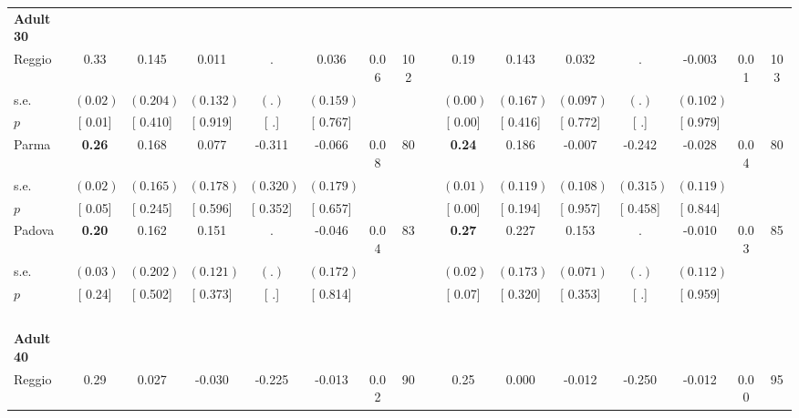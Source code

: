 \begin{longtable}{L{8em} c c c c c c c p{1em} c c c c c c c}
\quad \quad \textbf{Adult 30} & & & & & & & & & & & & & & & \\* 
\quad \quad \quad Reggio& 0.33 &     0.145 &     0.011 &         . &     0.036 &      0.06 &       102 & & 0.19 &     0.143 &     0.032 &         . &    -0.003 &      0.01 &       103  \\*
\quad \quad \quad \quad s.e.& $ (     0.02)$ & $ (    0.204)$ & $ (    0.132)$ & $ (        .)$ & $ (    0.159)$ & & & & $ (     0.00)$ & $ (    0.167)$ & $ (    0.097)$ & $ (        .)$ & $ (    0.102)$ & &  \\*
\quad \quad \quad \quad $ p$ & [     0.01] & [    0.410] & [    0.919] & [        .] & [    0.767] & & & & [     0.00] & [    0.416] & [    0.772] & [        .] & [    0.979] & &  \\[1em]
\quad \quad \quad Parma& \textbf{     0.26} &     0.168 &     0.077 &    -0.311 &    -0.066 &      0.08 &        80 & & \textbf{     0.24} &     0.186 &    -0.007 &    -0.242 &    -0.028 &      0.04 &        80  \\*
\quad \quad \quad \quad s.e.& $ (     0.02)$ & $ (    0.165)$ & $ (    0.178)$ & $ (    0.320)$ & $ (    0.179)$ & & & & $ (     0.01)$ & $ (    0.119)$ & $ (    0.108)$ & $ (    0.315)$ & $ (    0.119)$ & &  \\*
\quad \quad \quad \quad $ p$ & [     0.05] & [    0.245] & [    0.596] & [    0.352] & [    0.657] & & & & [     0.00] & [    0.194] & [    0.957] & [    0.458] & [    0.844] & &  \\[1em]
\quad \quad \quad Padova& \textbf{     0.20} &     0.162 &     0.151 &         . &    -0.046 &      0.04 &        83 & & \textbf{     0.27} &     0.227 &     0.153 &         . &    -0.010 &      0.03 &        85  \\*
\quad \quad \quad \quad s.e.& $ (     0.03)$ & $ (    0.202)$ & $ (    0.121)$ & $ (        .)$ & $ (    0.172)$ & & & & $ (     0.02)$ & $ (    0.173)$ & $ (    0.071)$ & $ (        .)$ & $ (    0.112)$ & &  \\*
\quad \quad \quad \quad $ p$ & [     0.24] & [    0.502] & [    0.373] & [        .] & [    0.814] & & & & [     0.07] & [    0.320] & [    0.353] & [        .] & [    0.959] & &  \\[1em]
~\\[1em]
\quad \quad \textbf{Adult 40} & & & & & & & & & & & & & & & \\* 
\quad \quad \quad Reggio& 0.29 &     0.027 &    -0.030 &    -0.225 &    -0.013 &      0.02 &        90 & & 0.25 &     0.000 &    -0.012 &    -0.250 &    -0.012 &      0.00 &        95  \\*

\end{longtable}
